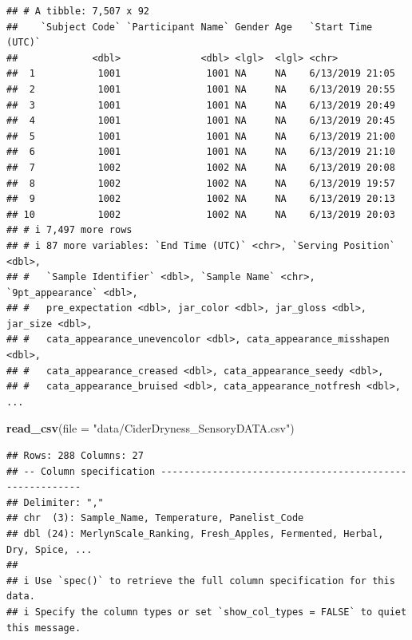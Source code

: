 \documentclass[
]{book}
\newenvironment{Shaded}{\begin{snugshade}}{\end{snugshade}}
\newcommand{\AttributeTok}[1]{\textcolor[rgb]{0.13,0.29,0.53}{#1}}
\newcommand{\FunctionTok}[1]{\textcolor[rgb]{0.13,0.29,0.53}{\textbf{#1}}}
\newcommand{\NormalTok}[1]{#1}
\newcommand{\StringTok}[1]{\textcolor[rgb]{0.31,0.60,0.02}{#1}}
\begin{document}
\begin{verbatim}
## # A tibble: 7,507 x 92
##    `Subject Code` `Participant Name` Gender Age   `Start Time (UTC)`
##             <dbl>              <dbl> <lgl>  <lgl> <chr>             
##  1           1001               1001 NA     NA    6/13/2019 21:05   
##  2           1001               1001 NA     NA    6/13/2019 20:55   
##  3           1001               1001 NA     NA    6/13/2019 20:49   
##  4           1001               1001 NA     NA    6/13/2019 20:45   
##  5           1001               1001 NA     NA    6/13/2019 21:00   
##  6           1001               1001 NA     NA    6/13/2019 21:10   
##  7           1002               1002 NA     NA    6/13/2019 20:08   
##  8           1002               1002 NA     NA    6/13/2019 19:57   
##  9           1002               1002 NA     NA    6/13/2019 20:13   
## 10           1002               1002 NA     NA    6/13/2019 20:03   
## # i 7,497 more rows
## # i 87 more variables: `End Time (UTC)` <chr>, `Serving Position` <dbl>,
## #   `Sample Identifier` <dbl>, `Sample Name` <chr>, `9pt_appearance` <dbl>,
## #   pre_expectation <dbl>, jar_color <dbl>, jar_gloss <dbl>, jar_size <dbl>,
## #   cata_appearance_unevencolor <dbl>, cata_appearance_misshapen <dbl>,
## #   cata_appearance_creased <dbl>, cata_appearance_seedy <dbl>,
## #   cata_appearance_bruised <dbl>, cata_appearance_notfresh <dbl>, ...
\end{verbatim}

\begin{Shaded}
\begin{Highlighting}[]
\FunctionTok{read\_csv}\NormalTok{(}\AttributeTok{file =} \StringTok{"data/CiderDryness\_SensoryDATA.csv"}\NormalTok{)}
\end{Highlighting}
\end{Shaded}

\begin{verbatim}
## Rows: 288 Columns: 27
## -- Column specification --------------------------------------------------------
## Delimiter: ","
## chr  (3): Sample_Name, Temperature, Panelist_Code
## dbl (24): MerlynScale_Ranking, Fresh_Apples, Fermented, Herbal, Dry, Spice, ...
## 
## i Use `spec()` to retrieve the full column specification for this data.
## i Specify the column types or set `show_col_types = FALSE` to quiet this message.
\end{verbatim}
\end{document}
